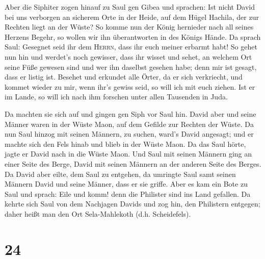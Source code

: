  Aber die Siphiter zogen hinauf zu Saul gen Gibea und
sprachen: Ist nicht David bei uns verborgen an sicherem Orte in der
Heide, auf dem Hügel Hachila, der zur Rechten liegt an der Wüste?
 So komme nun der König hernieder nach all seines Herzens
Begehr, so wollen wir ihn überantworten in des Königs Hände.
 Da sprach Saul: Gesegnet seid ihr dem \textsc{Herrn},
dass ihr euch meiner erbarmt habt!  So gehet nun hin und
werdet's noch gewisser, dass ihr wisset und sehet, an welchem Ort seine
Füße gewesen sind und wer ihn daselbst gesehen habe; denn mir ist
gesagt, dass er listig ist.  Besehet und erkundet alle
Örter, da er sich verkriecht, und kommet wieder zu mir, wenn ihr's
gewiss seid, so will ich mit euch ziehen. Ist er im Lande, so will ich
nach ihm forschen unter allen Tausenden in Juda.

 Da machten sie sich auf und gingen gen Siph vor Saul
hin. David aber und seine Männer waren in der Wüste Maon, auf dem
Gefilde zur Rechten der Wüste.  Da nun Saul hinzog mit
seinen Männern, zu suchen, ward's David angesagt; und er machte sich den
Fels hinab und blieb in der Wüste Maon. Da das Saul hörte, jagte er
David nach in die Wüste Maon.  Und Saul mit seinen
Männern ging an einer Seite des Berge, David mit seinen Männern an der
anderen Seite des Berges. Da David aber eilte, dem Saul zu entgehen, da
umringte Saul samt seinen Männern David und seine Männer, dass er sie
griffe.  Aber es kam ein Bote zu Saul und sprach: Eile
und komm! denn die Philister sind ins Land gefallen.  Da
kehrte sich Saul von dem Nachjagen Davids und zog hin, den Philistern
entgegen; daher heißt man den Ort Sela-Mahlekoth (d.h. Scheidefels).

\hypertarget{section-23}{%
\section{24}\label{section-23}}

